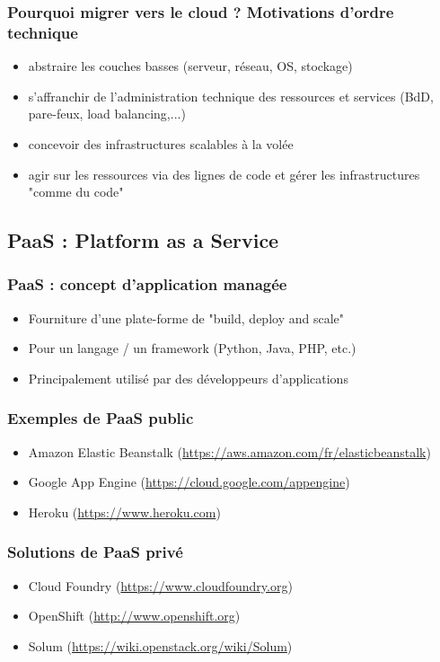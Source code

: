  \begin{frame}
    \frametitle{Pourquoi migrer vers le cloud ? Motivations d'ordre technique}
    \begin{itemize}
      \item abstraire les couches basses (serveur, réseau, OS, stockage)
      \pause
      \item s'affranchir de l'administration technique des ressources et services (BdD, pare-feux, load balancing,...)
      \pause
      \item concevoir des infrastructures scalables à la volée
      \pause
      \item agir sur les ressources via des lignes de code et gérer les infrastructures "comme du code"
    \end{itemize}
  \end{frame}

  \subsection[PaaS]{PaaS : Platform as a Service}

  \begin{frame}
    \frametitle{PaaS : concept d'application managée}
    \begin{itemize}
      \item Fourniture d'une plate-forme de "build, deploy and scale"
      \pause
      \item Pour un langage / un framework (Python, Java, PHP, etc.)
      \pause
      \item Principalement utilisé par des développeurs d'applications
    \end{itemize}
  \end{frame}

  \begin{frame}
    \frametitle{Exemples de PaaS public}
    \begin{itemize}
      \item Amazon Elastic Beanstalk (\url{https://aws.amazon.com/fr/elasticbeanstalk})
      \pause
      \item Google App Engine (\url{https://cloud.google.com/appengine})
      \pause
      \item Heroku (\url{https://www.heroku.com})
    \end{itemize}
  \end{frame}

  \begin{frame}
    \frametitle{Solutions de PaaS privé}
    \begin{itemize}
      \item Cloud Foundry (\url{https://www.cloudfoundry.org})
      \pause
      \item OpenShift (\url{http://www.openshift.org})
      \pause
      \item \alert<4->{Solum} (\url{https://wiki.openstack.org/wiki/Solum})
    \end{itemize}
  \end{frame}

